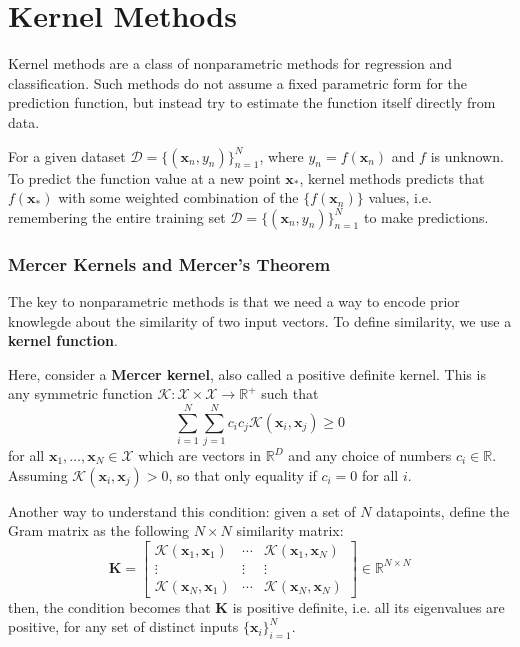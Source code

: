\documentclass[11pt]{article}
\begin{document}
\clearpage
\part{Kernel Methods}

Kernel methods are a class of nonparametric methods for regression and classification.
Such methods do not assume a fixed parametric form for the prediction function, but instead try to estimate the function itself directly from data.

For a given dataset $\mathcal{D} = \{(\boldsymbol{x}_n, y_n)\}_{n=1}^N$, where $y_n = f(\boldsymbol{x}_n)$ and $f$ is unknown.
To predict the function value at a new point $\boldsymbol{x}_*$, kernel methods predicts that $f(\boldsymbol{x}_*)$ with some weighted combination of the $\{ f(\boldsymbol{x}_n) \}$ values, i.e. remembering the entire
training set $\mathcal{D} = \{(\boldsymbol{x}_n, y_n)\}_{n=1}^N$ to make predictions. 

\section{Mercer Kernels and Mercer's Theorem}

The key to nonparametric methods is that we need a way to encode prior knowlegde about the similarity of two input vectors.
To define similarity, we use a \textbf{kernel function}. 

Here, consider a \textbf{Mercer kernel}, also called a positive definite kernel.
This is any symmetric function $\mathcal{K}: \mathcal{X} \times \mathcal{X} \to \mathbb{R}^+$ such that
\[
\sum_{i=1}^N \sum_{j=1}^N c_i c_j \mathcal{K}(\boldsymbol{x}_i, \boldsymbol{x}_j) \geq 0
\]
for all $\boldsymbol{x}_1, \ldots, \boldsymbol{x}_N \in \mathcal{X}$ which are vectors in $\mathbb{R}^D$ and any choice of numbers $c_i \in \mathbb{R}$. 
Assuming $\mathcal{K}(\boldsymbol{x}_i, \boldsymbol{x}_j) > 0$, so that only equality if $c_i = 0$ for all $i$.

Another way to understand this condition: given a set of $N$ datapoints, define the Gram matrix as the following $N \times N$ similarity matrix:
\[
\mathbf{K} = \begin{bmatrix}
\mathcal{K}(\boldsymbol{x}_1, \boldsymbol{x}_1) & \cdots & \mathcal{K}(\boldsymbol{x}_1, \boldsymbol{x}_N) \\
\vdots & \vdots & \vdots \\
\mathcal{K}(\boldsymbol{x}_N, \boldsymbol{x}_1) & \cdots & \mathcal{K}(\boldsymbol{x}_N, \boldsymbol{x}_N)
\end{bmatrix} \in \mathbb{R}^{N \times N}
\]
then, the condition becomes that $\mathbf{K}$ is positive definite, i.e. all its eigenvalues are positive, for any set of distinct inputs $\{\boldsymbol{x}_i\}_{i=1}^N$.
\end{document}
